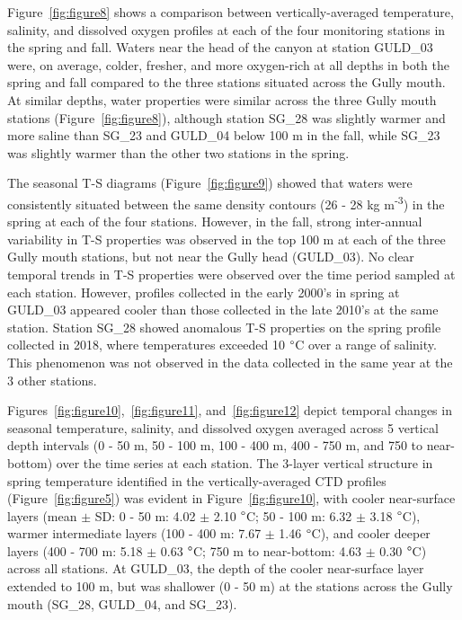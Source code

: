 \documentclass[12pt]{article}\usepackage[]{graphicx}\usepackage[]{color}
\begin{document}
Figure~\ref{fig:figure8} shows a comparison between vertically-averaged temperature, salinity, and dissolved oxygen profiles at each of the four monitoring stations in the spring and fall. Waters near the head of the canyon at station GULD\_03 were, on average, colder, fresher, and more oxygen-rich at all depths in both the spring and fall compared to the three stations situated across the Gully mouth. At similar depths, water properties were similar across the three Gully mouth stations (Figure~\ref{fig:figure8}), although station SG\_28 was slightly warmer and more saline than SG\_23 and GULD\_04 below 100 m in the fall, while SG\_23 was slightly warmer than the other two stations in the spring.

The seasonal T-S diagrams (Figure~\ref{fig:figure9}) showed that waters were consistently situated between the same density contours (26 - 28 kg m\textsuperscript{-3}) in the spring at each of the four stations. However, in the fall, strong inter-annual variability in T-S properties was observed in the top 100 m at each of the three Gully mouth stations, but not near the Gully head (GULD\_03). No clear temporal trends in T-S properties were observed over the time period sampled at each station. However, profiles collected in the early 2000's in spring at GULD\_03 appeared cooler than those collected in the late 2010's at the same station. Station SG\_28 showed anomalous T-S properties on the spring profile collected in 2018, where temperatures exceeded 10 \(\degree\)C over a range of salinity. This phenomenon was not observed in the data collected in the same year at the 3 other stations.

Figures~\ref{fig:figure10},~\ref{fig:figure11}, and~\ref{fig:figure12} depict temporal changes in seasonal temperature, salinity, and dissolved oxygen averaged across 5 vertical depth intervals (0 - 50 m, 50 - 100 m, 100 - 400 m, 400 - 750 m, and 750 to near-bottom) over the time series at each station. The 3-layer vertical structure in spring temperature identified in the vertically-averaged CTD profiles (Figure~\ref{fig:figure5}) was evident in Figure~\ref{fig:figure10}, with cooler near-surface layers (mean \(\pm\) SD: 0 - 50 m: 4.02 \(\pm\) 2.10 \(\degree\)C; 50 - 100 m: 6.32 \(\pm\) 3.18 \(\degree\)C), warmer intermediate layers (100 - 400 m: 7.67 \(\pm\) 1.46 \(\degree\)C), and cooler deeper layers (400 - 700 m: 5.18 \(\pm\) 0.63 \(\degree\)C; 750 m to near-bottom: 4.63 \(\pm\) 0.30 \(\degree\)C) across all stations. At GULD\_03, the depth of the cooler near-surface layer extended to 100 m, but was shallower (0 - 50 m) at the stations across the Gully mouth (SG\_28, GULD\_04, and SG\_23).
\end{document}
